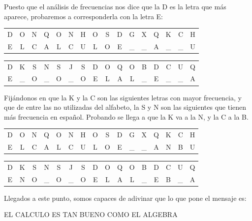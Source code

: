 \begin{problem}[5]
	Puesto que el análisis de frecuencias nos dice que la D es la letra que más aparece, probaremos a corresponderla con la letra E:

	\begin{center}
		\begin{tabular}{c c c c c c c c c c c c c c c c}
			D & O & N & Q & O & N & H & O & S & D & G & X & Q & K & C & H \\
			E & L & C & A & L & C & U & L & O & E & \_ & \_ & A & \_ & \_ & U
		\end{tabular}
	\end{center}

	\begin{center}
		\begin{tabular}{c c c c c c c c c c c c c c c c}
			D & K & S & N & S & J & S & D & O & Q & O & B & D & C & U & Q \\
			E & \_ & O & \_ & O & \_ & O & E & L & A & L & \_ & E & \_ & \_ & A
		\end{tabular}
	\end{center}

	Fijándonos en que la K y la C son las siguientes letras con mayor frecuencia, y que de entre las no utilizadas del alfabeto, la S y N son las siguientes que tienen más frecuencia en español. Probando se llega a que la K va a la N, y la C a la B.

	\begin{center}
		\begin{tabular}{c c c c c c c c c c c c c c c c}
			D & O & N & Q & O & N & H & O & S & D & G & X & Q & K & C & H \\
			E & L & C & A & L & C & U & L & O & E & \_ & \_ & A & N & B & U
		\end{tabular}
	\end{center}

	\begin{center}
		\begin{tabular}{c c c c c c c c c c c c c c c c}
			D & K & S & N & S & J & S & D & O & Q & O & B & D & C & U & Q \\
			E & N & O & \_ & O & \_ & O & E & L & A & L & \_ & E & B & \_ & A
		\end{tabular}
	\end{center}

	Llegados a este punto, somos capaces de adivinar que lo que pone el mensaje es:

	EL CALCULO ES TAN BUENO COMO EL ALGEBRA
\end{problem}



